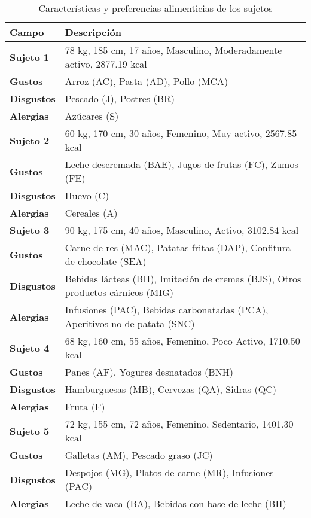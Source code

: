 \begin{table}[h!]
    \centering
    \renewcommand{\arraystretch}{1.1}
    \setlength{\tabcolsep}{3pt}
    \small
    \begin{tabularx}{\textwidth}{|l|X|}
    \hline
    \textbf{Campo} & \textbf{Descripción} \\
    \hline
    \textbf{Sujeto 1} & 78 kg, 185 cm, 17 años, Masculino, Moderadamente activo, 2877.19 kcal \\
    \textbf{Gustos} & Arroz (AC), Pasta (AD), Pollo (MCA) \\
    \textbf{Disgustos} & Pescado (J), Postres (BR) \\
    \textbf{Alergias} & Azúcares (S) \\
    \hline
    \textbf{Sujeto 2} & 60 kg, 170 cm, 30 años, Femenino, Muy activo, 2567.85 kcal \\
    \textbf{Gustos} & Leche descremada (BAE), Jugos de frutas (FC), Zumos (FE) \\
    \textbf{Disgustos} & Huevo (C)\\
    \textbf{Alergias} & Cereales (A) \\
    \hline
    \textbf{Sujeto 3} & 90 kg, 175 cm, 40 años, Masculino, Activo, 3102.84 kcal \\
    \textbf{Gustos} & Carne de res (MAC), Patatas fritas (DAP), Confitura de chocolate (SEA) \\
    \textbf{Disgustos} & Bebidas lácteas (BH), Imitación de cremas (BJS), Otros productos cárnicos (MIG) \\
    \textbf{Alergias} & Infusiones (PAC), Bebidas carbonatadas (PCA), Aperitivos no de patata (SNC) \\
    \hline
    \textbf{Sujeto 4} & 68 kg, 160 cm, 55 años, Femenino, Poco Activo, 1710.50 kcal \\
    \textbf{Gustos} & Panes (AF), Yogures desnatados (BNH) \\
    \textbf{Disgustos} & Hamburguesas (MB), Cervezas (QA), Sidras (QC) \\
    \textbf{Alergias} & Fruta (F) \\
    \hline
    \textbf{Sujeto 5} & 72 kg, 155 cm, 72 años, Femenino, Sedentario, 1401.30 kcal \\
    \textbf{Gustos} & Galletas (AM), Pescado graso (JC) \\
    \textbf{Disgustos} & Despojos (MG), Platos de carne (MR), Infusiones (PAC) \\
    \textbf{Alergias} & Leche de vaca (BA), Bebidas con base de leche (BH) \\
    \hline
    \end{tabularx}
    \caption{Características y preferencias alimenticias de los sujetos}
    \label{table:caracteristicas_preferencias}
\end{table}